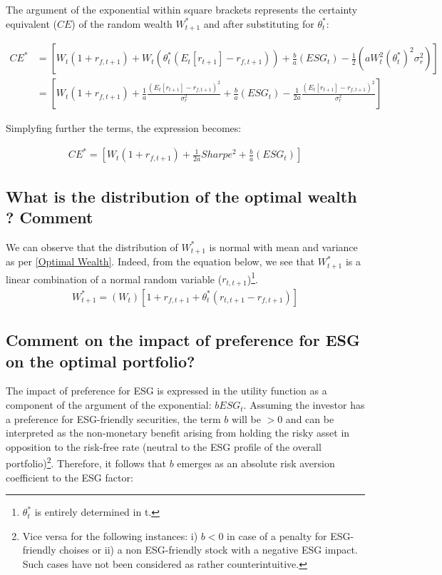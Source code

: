 \documentclass[12pt]{article}
\begin{document}
	The argument of the exponential within square brackets represents the certainty equivalent ($CE$) of the random wealth $W_{t+1}^{*}$ and after substituting for $\theta_t^{*}$: \vspace{-2em}
	
	\begin{align*}
		CE^* &= [W_t(1 + r_{f,t+1}) + W_t(\theta_t^*(E_{t}[r_{t+1}]-r_{f, t+1})) + \frac{b}{a}(ESG_t) - \frac{1}{2}(aW_t^2(\theta_t^{*})^2\sigma_r^2)] \\
		&= [W_t(1 + r_{f,t+1}) + \frac{1}{a}\frac{(E_{t}[r_{t+1}]-r_{f, t+1})^2}{\sigma_r^2} + \frac{b}{a}(ESG_t) - \frac{1}{2a}\frac{(E_{t}[r_{t+1}]-r_{f, t+1})^2}{\sigma_r^2}]
	\end{align*} \vspace{-1.5em}
	
	Simplyfing further the terms, the expression becomes: \vspace{-1.75em}
	
	\begin{align}
		CE^* = [W_t(1 + r_{f,t+1}) + \frac{1}{2a}Sharpe^2 + \frac{b}{a}(ESG_t)] 
	\end{align} \vspace{-2.5em}
	
	\subsection{What is the distribution of the optimal wealth ? Comment}
	We can observe that the distribution of $W_{t+1}^{*}$ is normal with mean and variance as per \ref{Optimal Wealth}. Indeed, from the equation below, we see that $W_{t+1}^{*}$ is a linear combination of a normal random variable ($r_{t,t+1}$)\footnote {$\theta_t^*$ is entirely determined in t.}.
	\begin{align}
		W_{t+1}^{*} = (W_t) \left[1 + r_{f,t+1} + \theta_t^*(r_{t,t+1}-r_{f, t+1}) \right]
	\end{align} \vspace{-2.5em}
	
	\subsection{Comment on the impact of preference for ESG on the optimal portfolio?}
	
	The impact of preference for ESG is expressed in the utility function as a component of the argument of the exponential: $bESG_t$. 
	Assuming the investor has a preference for ESG-friendly securities, the term $b$ will be $> 0$ and can be interpreted as the non-monetary benefit arising from holding the risky asset in opposition to the risk-free rate (neutral to the ESG profile of the overall portfolio)\footnote {Vice versa for the following instances: i) $b < 0 $ in case of a penalty for ESG-friendly choises or ii) a non ESG-friendly stock with a negative ESG impact. Such cases have not been considered as rather counterintuitive.}. Therefore, it follows that $b$ emerges as an absolute risk aversion coefficient to the ESG factor:
	
\end{document}
